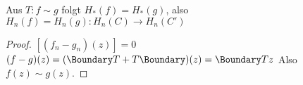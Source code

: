 \begin{prop}
    Aus $T: f \sim g$ folgt $H_*(f) = H_*(g)$, also
    \begin{math}
        H_n(f) = H_n(g): H_n(C) \to H_n(C')
    \end{math}
    \begin{proof}
        $[(f_n - g_n)(z)] = 0$
        \begin{math}
            (f-g)(z)
            = (\Boundary T + T \Boundary)(z)
            = \Boundary T z
        \end{math}
        Also $f(z) \sim g(z)$.
    \end{proof}
\end{prop}
